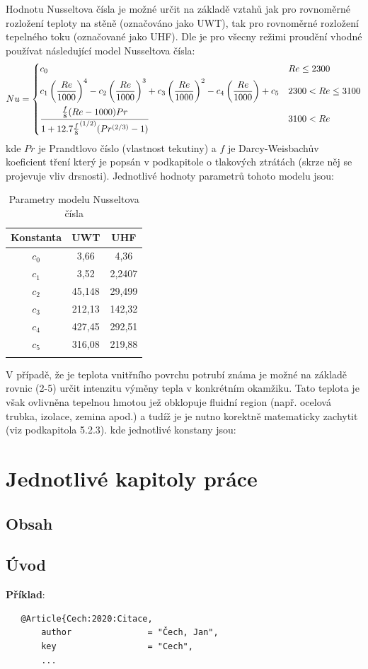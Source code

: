 Hodnotu Nusseltova čísla je možné určit na základě vztahů jak pro rovnoměrné 
rozložení teploty na stěně (označováno jako UWT), tak pro rovnoměrné rozložení
tepelného toku (označované jako UHF). Dle \cite{Abraham2009} je pro všecny
režimi proudění vhodné používat následující model Nusseltova čísla:
\begin{equation}
Nu = 
\begin{dcases}
  c_0 & Re\leq 2300 \\
  c_1\left(\frac{Re}{1000}\right)^4
  -c_2\left(\frac{Re}{1000}\right)^3
  +c_3\left(\frac{Re}{1000}\right)^2
  -c_4\left(\frac{Re}{1000}\right)
  +c_5 & 2300 < Re\le 3100 \\
  \frac{\frac{f}{8}(Re-1000)Pr}
  {1+12.7{\frac{f}{8}}^{(1/2)}(Pr^{(2/3)}-1)} & 3100 < Re
\end{dcases} 
\end{equation}
kde \(Pr\) je Prandtlovo číslo (vlastnost tekutiny) a \(f\) je Darcy-Weisbachův 
koeficient tření který je popsán v podkapitole o tlakových ztrátách (skrze něj 
se projevuje vliv drsnosti). Jednotlivé hodnoty parametrů tohoto modelu jsou:

\begin{table}[H]
  \vskip6pt
  \caption{Parametry modelu Nusseltova čísla}
    \vskip6pt
  \centering
  \begin{tabular}{ccc}
    \toprule
    Konstanta & UWT & UHF \\ [0.5ex]
    \hline
    \(c_0\) & 3,66 & 4,36 \\ 
    \(c_1\) & 3,52 & 2,2407 \\
    \(c_2\) & 45,148 & 29,499 \\
    \(c_3\) & 212,13 & 142,32 \\
    \(c_4\) & 427,45 & 292,51 \\
    \(c_5\) & 316,08 & 219,88 \\
    \bottomrule \\[0.1mm]
  \end{tabular}
  \label{tab:ExampleTable2}
\end{table}

V případě, že je teplota vnitřního povrchu potrubí
známa je možné na základě rovnic (2-5) určit intenzitu výměny tepla v
konkrétním okamžiku. Tato teplota je však ovlivněna tepelnou hmotou jež
obklopuje fluidní region (např. ocelová trubka, izolace, zemina apod.) a tudíž
je je nutno korektně matematicky zachytit (viz podkapitola 5.2.3).
kde jednotlivé konstany jsou:
\chapter{Jednotlivé kapitoly práce}
\label{kapitoly}

\section{Obsah}
\label{obsah}

\section{Úvod}
\label{uvod}

\textbf{Příklad}:
\begin{verbatim}
   @Article{Cech:2020:Citace,
	   author               = "Čech, Jan",
	   key                  = "Cech",
	   ... 
\end{verbatim}


